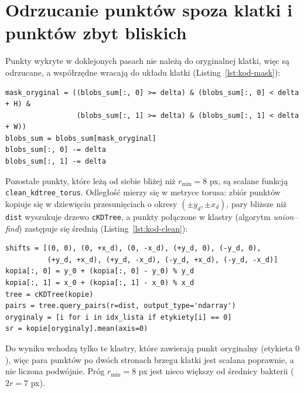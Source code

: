 \documentclass[12pt,a4paper,twoside,openright]{report}
\theoremstyle{definition}
\theoremstyle{remark}
\begin{document}
{\section{Odrzucanie punktów spoza klatki i punktów zbyt bliskich}
Punkty wykryte w doklejonych pasach nie należą do oryginalnej klatki, więc są odrzucane, a współrzędne wracają do układu klatki (Listing~\ref{lst:kod-mask}):
\begin{lstlisting}[style=pykod,caption={Odrzucenie punktów spoza oryginalnej klatki},label={lst:kod-mask}]
mask_oryginal = ((blobs_sum[:, 0] >= delta) & (blobs_sum[:, 0] < delta + H) &
                 (blobs_sum[:, 1] >= delta) & (blobs_sum[:, 1] < delta + W))
blobs_sum = blobs_sum[mask_oryginal]
blobs_sum[:, 0] -= delta
blobs_sum[:, 1] -= delta
\end{lstlisting}
Pozostałe punkty, które leżą od siebie bliżej niż $r_{\min}=8$ px, są scalane funkcją \texttt{clean\_kdtree\_torus}. Odległość mierzy się w metryce torusa: zbiór punktów kopiuje się w dziewięciu przesunięciach o okresy $(\pm y_d,\pm x_d)$, pary bliższe niż \texttt{dist} wyszukuje drzewo \texttt{cKDTree}, a punkty połączone w klastry (algorytm \emph{union--find}) zastępuje się średnią (Listing~\ref{lst:kod-clean}):
\begin{lstlisting}[style=pykod,caption={Scalanie punktów zbyt bliskich w metryce torusa (\texttt{clean\_kdtree\_torus})},label={lst:kod-clean}]
shifts = [(0, 0), (0, +x_d), (0, -x_d), (+y_d, 0), (-y_d, 0),
          (+y_d, +x_d), (+y_d, -x_d), (-y_d, +x_d), (-y_d, -x_d)]
kopia[:, 0] = y_0 + (kopia[:, 0] - y_0) % y_d
kopia[:, 1] = x_0 + (kopia[:, 1] - x_0) % x_d
tree = cKDTree(kopie)
pairs = tree.query_pairs(r=dist, output_type='ndarray')
oryginaly = [i for i in idx_lista if etykiety[i] == 0]
sr = kopie[oryginaly].mean(axis=0)
\end{lstlisting}
Do wyniku wchodzą tylko te klastry, które zawierają punkt oryginalny (etykieta $0$), więc para punktów po dwóch stronach brzegu klatki jest scalana poprawnie, a nie liczona podwójnie. Próg $r_{\min}=8$ px jest nieco większy od średnicy bakterii ($2r=7$ px).

}
\end{document}
